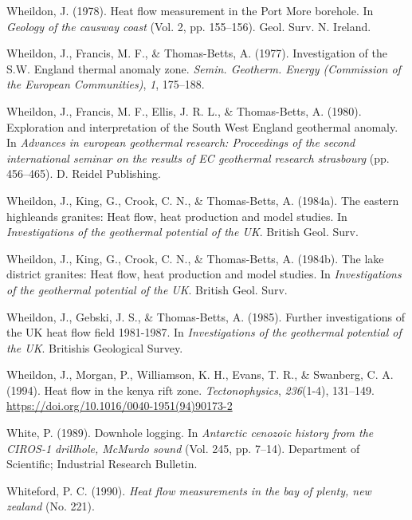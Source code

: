 \begin{CSLReferences}{1}{1}
\leavevmode{}%
Wheildon, J. (1978). Heat flow measurement in the {Port More} borehole. In \emph{Geology of the causway coast} (Vol. 2, pp. 155--156). Geol. Surv. N. Ireland.

\leavevmode{}%
Wheildon, J., Francis, M. F., \& Thomas-Betts, A. (1977). Investigation of the {S.W.} England thermal anomaly zone. \emph{Semin. Geotherm. Energy (Commission of the European Communities)}, \emph{1}, 175--188.

\leavevmode{}%
Wheildon, J., Francis, M. F., Ellis, J. R. L., \& Thomas-Betts, A. (1980). Exploration and interpretation of the {South West England} geothermal anomaly. In \emph{Advances in european geothermal research: Proceedings of the second international seminar on the results of EC geothermal research strasbourg} (pp. 456--465). D. Reidel Publishing.

\leavevmode{}%
Wheildon, J., King, G., Crook, C. N., \& Thomas-Betts, A. (1984a). The eastern highleands granites: Heat flow, heat production and model studies. In \emph{Investigations of the geothermal potential of the UK}. British Geol. Surv.

\leavevmode{}%
Wheildon, J., King, G., Crook, C. N., \& Thomas-Betts, A. (1984b). The lake district granites: Heat flow, heat production and model studies. In \emph{Investigations of the geothermal potential of the UK}. British Geol. Surv.

\leavevmode{}%
Wheildon, J., Gebski, J. S., \& Thomas-Betts, A. (1985). Further investigations of the UK heat flow field 1981-1987. In \emph{Investigations of the geothermal potential of the UK}. Britishis Geological Survey.

\leavevmode{}%
Wheildon, J., Morgan, P., Williamson, K. H., Evans, T. R., \& Swanberg, C. A. (1994). Heat flow in the kenya rift zone. \emph{Tectonophysics}, \emph{236}(1-4), 131--149. \url{https://doi.org/10.1016/0040-1951(94)90173-2}

\leavevmode{}%
White, P. (1989). Downhole logging. In \emph{Antarctic cenozoic history from the CIROS-1 drillhole, McMurdo sound} (Vol. 245, pp. 7--14). Department of Scientific; Industrial Research Bulletin.

\leavevmode{}%
Whiteford, P. C. (1990). \emph{Heat flow measurements in the bay of plenty, new zealand} (No. 221).


\end{CSLReferences}
